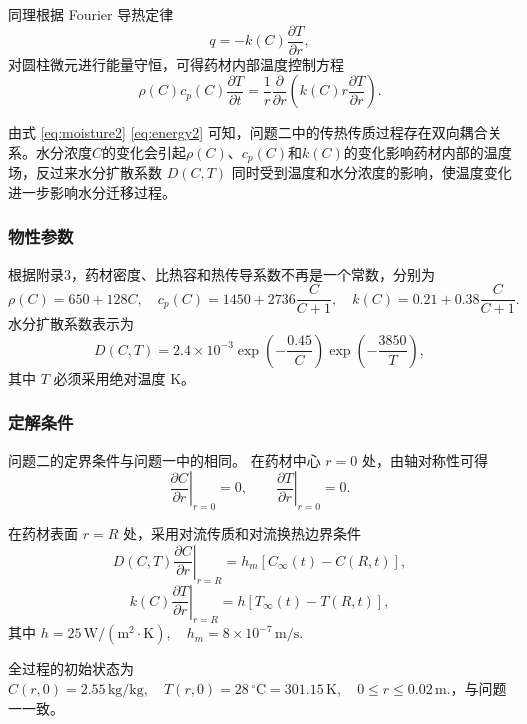 \documentclass[12pt,a4paper]{article}
\begin{document}
同理根据 Fourier 导热定律
\begin{equation}
q=-k(C)\frac{\partial T}{\partial r},
\end{equation}
对圆柱微元进行能量守恒，可得药材内部温度控制方程
\begin{equation}
\rho(C)c_p(C)\frac{\partial T}{\partial t}
=
\frac{1}{r}
\frac{\partial}{\partial r}
\left(
k(C)r\frac{\partial T}{\partial r}
\right).
\label{eq:energy2}
\end{equation}

由式 \eqref{eq:moisture2} \eqref{eq:energy2} 可知，问题二中的传热传质过程存在双向耦合关系。水分浓度$C$的变化会引起$\rho(C)$、$c_p(C)$和$k(C)$的变化影响药材内部的温度场，反过来水分扩散系数 $D(C,T)$ 同时受到温度和水分浓度的影响，使温度变化进一步影响水分迁移过程。

\subsubsection{物性参数}

根据附录3，药材密度、比热容和热传导系数不再是一个常数，分别为
$$
\rho(C)=650+128C,
\quad
c_p(C)=1450+2736\frac{C}{C+1},
\quad
k(C)=0.21+0.38\frac{C}{C+1}.
$$
水分扩散系数表示为
$$
D(C,T)
=
2.4\times10^{-3}
\exp\left(-\frac{0.45}{C}\right)
\exp\left(-\frac{3850}{T}\right),
\label{eq:D2}
$$
其中 $T$ 必须采用绝对温度 $\mathrm{K}$。

\subsubsection{定解条件}
问题二的定界条件与问题一中的相同。
在药材中心 $r=0$ 处，由轴对称性可得
\begin{equation}
\left.
\frac{\partial C}{\partial r}
\right|_{r=0}
=
0,
\qquad
\left.
\frac{\partial T}{\partial r}
\right|_{r=0}
=
0.
\end{equation}

在药材表面 $r=R$ 处，采用对流传质和对流换热边界条件
\begin{equation}
D(C,T)
\left.
\frac{\partial C}{\partial r}
\right|_{r=R}
=
h_m
\left[
C_\infty(t)-C(R,t)
\right],
\end{equation}
\begin{equation}
k(C)
\left.
\frac{\partial T}{\partial r}
\right|_{r=R}
=
h
\left[
T_\infty(t)-T(R,t)
\right],
\end{equation}
其中
$h=25\,\mathrm{W/(m^2\cdot K)},
\quad
h_m=8\times10^{-7}\,\mathrm{m/s}.$

全过程的初始状态为
$C(r,0)=2.55\,\mathrm{kg/kg},
\quad
T(r,0)=28\,^\circ\mathrm{C}=301.15\,\mathrm{K},
\quad
0\leq r\leq0.02\,\mathrm{m}.$，与问题一一致。
\end{document}
